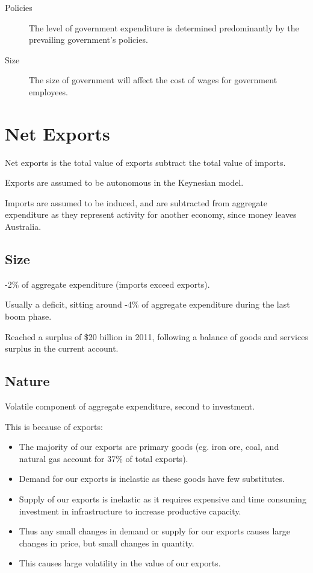 \documentclass[a4paper,11pt]{article}
\begin{document}
\begin{description}
\item [Policies] The level of government expenditure is determined predominantly
	by the prevailing government's policies.
\item [Size] The size of government will affect the cost of wages for government
	employees.
\end{description}




\section{Net Exports}

Net exports is the total value of exports subtract the total value of imports.

Exports are assumed to be autonomous in the Keynesian model.

Imports are assumed to be induced, and are subtracted from aggregate expenditure
as they represent activity for another economy, since money leaves Australia.


\subsection{Size}

-2\% of aggregate expenditure (imports exceed exports).

Usually a deficit, sitting around -4\% of aggregate expenditure during the
last boom phase.

Reached a surplus of \$20 billion in 2011, following a balance of goods and
services surplus in the current account.


\subsection{Nature}

Volatile component of aggregate expenditure, second to investment.

This is because of exports:

\begin{itemize}
\item The majority of our exports are primary goods (eg.  iron ore, coal, and
	natural gas account for 37\% of total exports).
\item Demand for our exports is inelastic as these goods have few substitutes.
\item Supply of our exports is inelastic as it requires expensive and time
	consuming investment in infrastructure to increase productive capacity.
\item Thus any small changes in demand or supply for our exports causes large
	changes in price, but small changes in quantity.
\item This causes large volatility in the value of our exports.
\end{itemize}
\end{document}
